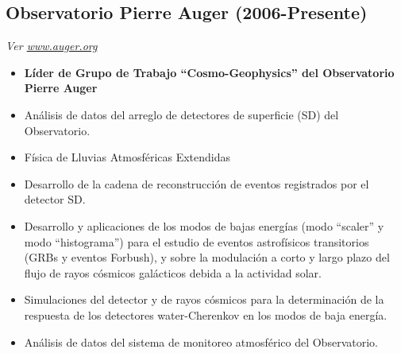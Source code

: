 \subsection*{Observatorio Pierre Auger (2006-Presente)}

{\small{\textit{Ver \href{http://www.auger.org/}{www.auger.org}}}}
\begin{itemize}
\item {\bf{Líder de Grupo de Trabajo ``Cosmo-Geophysics'' del Observatorio Pierre Auger}}
\item Análisis de datos del arreglo de detectores de superficie (SD) del Observatorio.
\item Física de Lluvias Atmosféricas Extendidas
\item Desarrollo de la cadena de reconstrucción de eventos registrados por el detector SD.
\item Desarrollo y aplicaciones de los modos de bajas energías (modo ``scaler'' y modo ``histograma'') para el estudio de eventos astrofísicos transitorios (GRBs y eventos Forbush), y sobre la modulación a corto y largo plazo del flujo de rayos cósmicos galácticos debida a la actividad solar.
\item Simulaciones del detector y de rayos cósmicos para la determinación de la respuesta de los detectores water-Cherenkov en los modos de baja energía.
\item Análisis de datos del sistema de monitoreo atmosférico del Observatorio.
\end{itemize}

